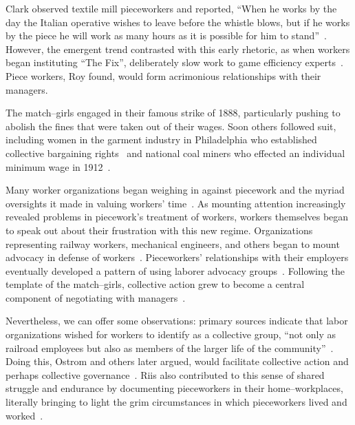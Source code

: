 \documentclass[pn4226]{subfiles}
\begin{document}
Clark observed textile mill pieceworkers and reported,
``When he works by the day the Italian operative wishes to leave before the whistle blows,
but if he works by the piece he will work as many hours as it is possible for him to stand''~\cite{clark1908cotton}.
However, the emergent trend contrasted with this early rhetoric, as
when workers began instituting ``The Fix'', deliberately slow work to game efficiency experts~\cite{roy1954efficiency}.
Piece workers, Roy found, would form acrimonious relationships with their managers.

The match--girls engaged in their famous strike of 1888, particularly pushing to abolish the fines that were taken out of their wages.
Soon others followed suit, including women in the garment industry in Philadelphia who established collective bargaining rights~\cite{10.2307/41829256} and national coal miners who effected an individual minimum wage in 1912~\cite{10.2307/2221944}.


Many worker organizations began weighing in against piecework and the myriad oversights it made in valuing workers' time~\cite{american1921problem,richards1904anything}.
As mounting attention increasingly revealed problems in piecework's treatment of workers,
workers themselves began to speak out about their frustration with this new regime.
Organizations representing
railway workers,
mechanical engineers, and
others began to mount advocacy in defense of workers~\cite{american1921problem,richards1904anything}.
Pieceworkers' relationships with their employers eventually developed a pattern of using 
laborer advocacy groups~\cite{levi2009union,ahlquist2013interest,mccallum2013global,jacoby1983union}.
Following the template of the match--girls, collective action grew to become a central component of negotiating with managers~\cite{russell1982collective,olsonlogic}.

Nevertheless, we can offer some observations:
primary sources indicate that labor organizations wished for workers to identify as a collective group, 
``not only as railroad employees but also as members of the larger life of the community''~\cite{american1921problem}.
Doing this, 
Ostrom and others later argued,
would facilitate collective action and perhaps collective governance~\cite{ostrom1990governing,russell1982collective,olsonlogic}.
Riis also contributed to this sense of shared struggle and endurance
by documenting pieceworkers in their home--workplaces,
literally bringing to light the grim circumstances in which pieceworkers lived and worked~\cite{riisOtherSideLives}.
\end{document}
